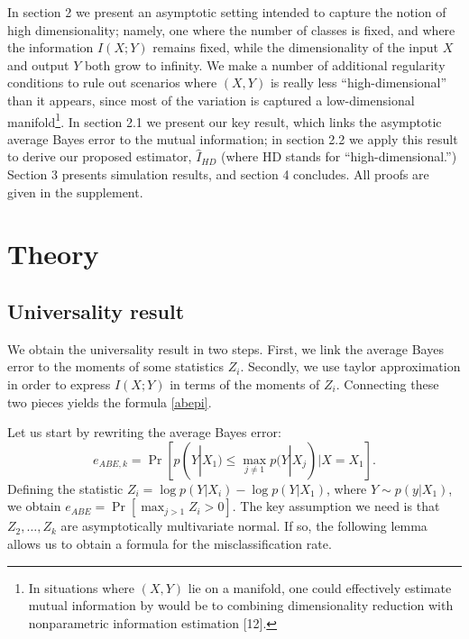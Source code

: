 \documentclass{article}
\begin{document}
In section 2 we present an asymptotic setting intended to capture the
notion of high dimensionality; namely, one where the number of classes
is fixed, and where the information $I(X; Y)$ remains fixed, while the
dimensionality of the input $X$ and output $Y$ both grow to infinity.
We make a number of additional regularity conditions to rule out
scenarios where $(X, Y)$ is really less ``high-dimensional'' than it
appears, since most of the variation is captured a low-dimensional
manifold\footnote{In situations where $(X, Y)$ lie on a manifold, one
  could effectively estimate mutual information by would be to
  combining dimensionality reduction with nonparametric information
  estimation [12]. }.  In section 2.1 we
present our key result, which links the asymptotic average Bayes error
to the mutual information; in section 2.2 we apply this result to
derive our proposed estimator, $\hat{I}_{HD}$ (where HD stands for
``high-dimensional.'')  Section 3 presents simulation results, and
section 4 concludes.  All proofs are given in the supplement.


\section{Theory}

\subsection{Universality result}

We obtain the universality result in two steps.  First, we link the
average Bayes error to the moments of some statistics $Z_i$.
Secondly, we use taylor approximation in order to express $I(X; Y)$ in
terms of the moments of $Z_i$.  Connecting these two pieces yields the
formula \eqref{abepi}.

Let us start by rewriting the average Bayes error:
\[
e_{ABE, k} = \Pr[p(Y|X_1) \leq \max_{j \neq 1} p(Y|X_j)| X = X_1].
\]
Defining the statistic $Z_i = \log p(Y|X_i) - \log p(Y|X_1)$, where $Y
\sim p(y|X_1)$, we obtain $ e_{ABE} = \Pr[\max_{j > 1} Z_i > 0].  $
The key assumption we need is that $Z_2,\hdots, Z_k$ are
asymptotically multivariate normal.  If so, the following lemma allows
us to obtain a formula for the misclassification rate.
\end{document}
